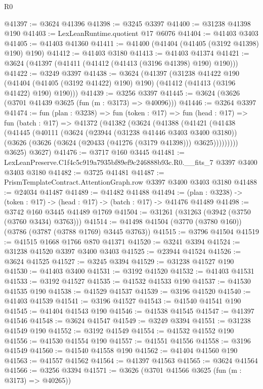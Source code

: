 \begin{lexlean}{R0}
\begin{coremodule}
@41397 := @3624 @41396
@41398 := @3245 @3397
@41400 := @31238 @41398 @190
@41403 := LexLeanRuntime.quotient @17 @6076
@41404 := @41403 @3403
@41405 := @41403 @41360
@41411 := @41400 (@41404 (@41405 (@3192 @41398) @190) @190)
@41412 := @41403 @3180
@41413 := @41403 @41374
@41421 := @3624 (@41397 (@41411 (@41412 (@41413 (@3196 @41398) @190) @190)))
@41422 := @3249 @3397
@41438 := @3624
    (@41397
      (@31238
        @41422
        @190
        (@41404 (@41405 (@3192 @41422) @190) @190)
        (@41412 (@41413 (@3196 @41422) @190) @190)))
@41439 := @3256 @3397
@41445 := @3624 (@3626 (@3701 @41439 @3625 (fun (m : @3173) => @40096)))
@41446 := @3264 @3397
@41474 := fun (plan : @3238) =>
  fun (token : @17) =>
  fun (head : @17) =>
  fun (batch : @17) =>
  @41372
    (@41382
      (@3624
        (@41388
          (@41421
            (@41438
              (@41445
                (@40111
                  (@3624
                    (@23944 (@31238 @41446 @3403 @3400 @3180))
                    (@3626 (@3626 (@3624 (@20433 (@41276 (@3179 @41398))) @3625)))))))))
        @3625)
      @3627)
@41476 := @3717 @160 @3445
@41481 := LexLeanPreserve.C1f4c5c919a7935bf89ef9c246888b93c.R0.__fits_7 @3397 @3400 @3403 @3180
@41482 := @3725 @41481
@41487 := PrismTemplateContract.AttentionGraph.row @3397 @3400 @3403 @3180
@41488 := @24034 @41487
@41489 := @41482 @41488
@41494 := (plan : @3238) -> (token : @17) -> (head : @17) -> (batch : @17) -> @41476 @41489
@41498 := @3742 @160 @3445 @41489 @1769
@41504 := @31261 (@31263 (@3942 (@3750 (@3760 @3434) @3763)))
@41514 := @41498 @41504 (@3770 (@3780 @160)) (@3786 (@3787 (@3788 @1769) @3445 @3763))
@41515 := @3796 @41504
@41519 := @41515 @1668 @1766 @870 @41371
@41520 := @3241 @3394
@41524 := @31238 @41520 @3397 @3400 @3403
@41525 := @23944 @41524
@41526 := @3624 @41525
@41527 := @3245 @3394
@41529 := @31238 @41527 @190
@41530 := @41403 @3400
@41531 := @3192 @41520
@41532 := @41403 @41531
@41533 := @3192 @41527
@41535 := @41532 @41533 @190
@41537 := @41530 @41535 @190
@41538 := @41529 @41537
@41539 := @3196 @41520
@41540 := @41403 @41539
@41541 := @3196 @41527
@41543 := @41540 @41541 @190
@41545 := @41404 @41543 @190
@41546 := @41538 @41545
@41547 := @41397 @41546
@41548 := @3624 @41547
@41549 := @3249 @3394
@41551 := @31238 @41549 @190
@41552 := @3192 @41549
@41554 := @41532 @41552 @190
@41556 := @41530 @41554 @190
@41557 := @41551 @41556
@41558 := @3196 @41549
@41560 := @41540 @41558 @190
@41562 := @41404 @41560 @190
@41563 := @41557 @41562
@41564 := @41397 @41563
@41565 := @3624 @41564
@41566 := @3256 @3394
@41571 := @3626 (@3701 @41566 @3625 (fun (m : @3173) => @40265))

\end{coremodule}
\end{lexlean}
